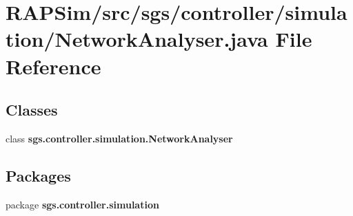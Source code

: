 \section{R\-A\-P\-Sim/src/sgs/controller/simulation/\-Network\-Analyser.java File Reference}
\label{_network_analyser_8java}
\subsection*{Classes}
\begin{DoxyCompactItemize}
\item 
class {\bf sgs.\-controller.\-simulation.\-Network\-Analyser}
\end{DoxyCompactItemize}
\subsection*{Packages}
\begin{DoxyCompactItemize}
\item 
package {\bf sgs.\-controller.\-simulation}
\end{DoxyCompactItemize}
